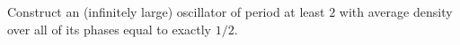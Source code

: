 \begin{multicols}{2}
	
	\mfilbreak
	
	
	\begin{problem}\label{exer:dense_oscillator} 
		Construct an (infinitely large) oscillator of period at least $2$ with average density over all of its phases equal to exactly $1/2$.
	\end{problem}
	
\end{multicols}
\normalsize\vspace*{0.01cm}\ifdefined\FORPRINTING{}\else%
\fi
